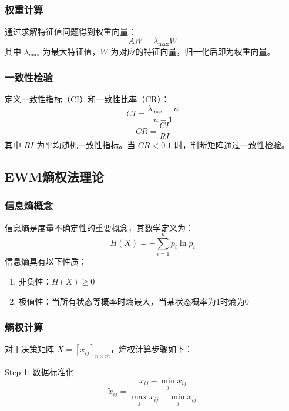 \subsubsection{权重计算}

通过求解特征值问题得到权重向量：
\begin{equation}
AW = \lambda_{\max} W
\label{eq:eigenvalue}
\end{equation}
其中 $\lambda_{\max}$ 为最大特征值，$W$ 为对应的特征向量，归一化后即为权重向量。

\subsubsection{一致性检验}

定义一致性指标（CI）和一致性比率（CR）：
\begin{equation}
CI = \frac{\lambda_{\max} - n}{n - 1}
\label{eq:ci}
\end{equation}
\begin{equation}
CR = \frac{CI}{RI}
\label{eq:cr}
\end{equation}
其中 $RI$ 为平均随机一致性指标。当 $CR < 0.1$ 时，判断矩阵通过一致性检验。

\subsection{EWM熵权法理论}

\subsubsection{信息熵概念}

信息熵是度量不确定性的重要概念，其数学定义为：
\begin{equation}
H(X) = -\sum_{i=1}^{n} p_i \ln p_i
\label{eq:entropy}
\end{equation}
信息熵具有以下性质：
\begin{enumerate}
\item 非负性：$H(X) \geq 0$
\item 极值性：当所有状态等概率时熵最大，当某状态概率为1时熵为0
\end{enumerate}

\subsubsection{熵权计算}

对于决策矩阵 $X = [x_{ij}]_{n \times m}$，熵权计算步骤如下：

Step 1: 数据标准化
\begin{equation}
\tilde{x}_{ij} = \frac{x_{ij} - \min_j x_{ij}}{\max_j x_{ij} - \min_j x_{ij}}
\label{eq:normalize}
\end{equation}

